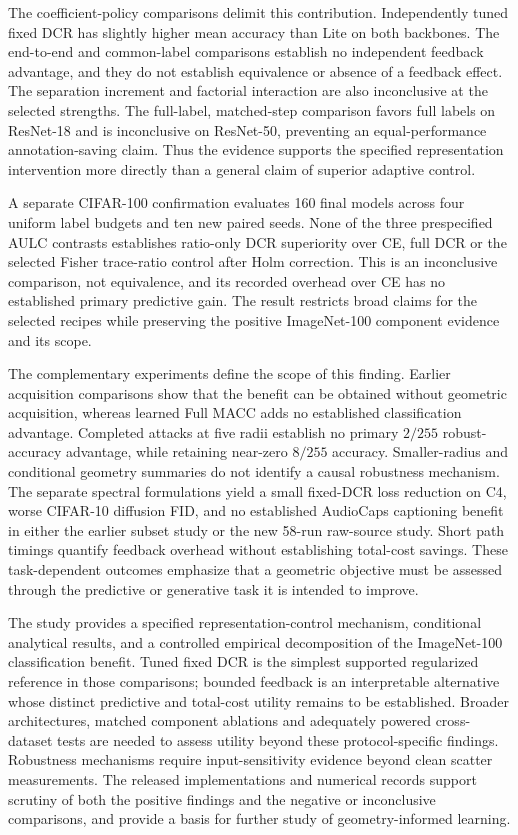 \documentclass[10pt,a4paper,twocolumn]{article}
\begin{document}
The coefficient-policy comparisons delimit this contribution.
Independently tuned fixed DCR has slightly higher mean accuracy than
Lite on both backbones. The end-to-end and common-label comparisons
establish no independent feedback advantage, and they do not establish
equivalence or absence of a feedback effect. The separation increment
and factorial interaction are also inconclusive at the selected
strengths. The full-label, matched-step comparison favors full labels
on ResNet-18 and is inconclusive on ResNet-50, preventing an
equal-performance annotation-saving claim. Thus the evidence supports
the specified representation intervention more directly than a general
claim of superior adaptive control.

A separate CIFAR-100 confirmation evaluates 160 final models across
four uniform label budgets and ten new paired seeds. None of the three
prespecified AULC contrasts establishes ratio-only DCR superiority over
CE, full DCR or the selected Fisher trace-ratio control after Holm
correction. This is an inconclusive comparison, not equivalence, and its
recorded overhead over CE has no established primary predictive gain.
The result restricts broad claims for the selected recipes while
preserving the positive ImageNet-100 component evidence and its scope.

The complementary experiments define the scope of this finding.
Earlier acquisition comparisons show that the benefit can be obtained
without geometric acquisition, whereas learned Full MACC adds no
established classification advantage. Completed attacks at five radii establish no primary $2/255$
robust-accuracy advantage, while retaining near-zero $8/255$ accuracy.
Smaller-radius and conditional geometry summaries do not identify a
causal robustness mechanism. The separate spectral formulations yield a small fixed-DCR
loss reduction on C4, worse CIFAR-10 diffusion FID, and no established
AudioCaps captioning benefit in either the earlier subset study or the
new 58-run raw-source study. Short path timings quantify feedback overhead
without establishing total-cost savings. These task-dependent outcomes emphasize
that a geometric objective must be assessed through the predictive or
generative task it is intended to improve.

The study provides a specified representation-control mechanism,
conditional analytical results, and a controlled empirical decomposition
of the ImageNet-100 classification benefit. Tuned fixed DCR is the
simplest supported regularized reference in those comparisons; bounded feedback is
an interpretable alternative whose distinct predictive and total-cost
utility remains to be established. Broader architectures, matched
component ablations and adequately powered cross-dataset tests are
needed to assess utility beyond these protocol-specific findings. Robustness mechanisms require
input-sensitivity evidence beyond clean scatter measurements. The
released implementations and numerical records support scrutiny of
both the positive findings and the negative or inconclusive comparisons,
and provide a basis for further study of geometry-informed learning.
\end{document}
